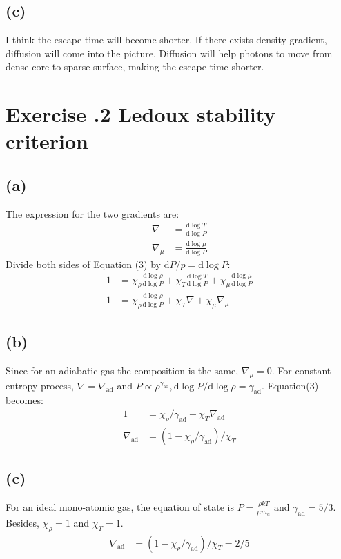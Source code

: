 \documentclass[a4paper,12pt]{article}
\renewcommand{\d}{\mathrm{d}}
\begin{document}
\subsection*{(c)}
I think the escape time will become shorter. If there exists density gradient, diffusion will come into the picture.
Diffusion will help photons to move from dense core to sparse surface, making the escape time shorter.



\section*{\textbf{Exercise \uppercase\expandafter{}.2 Ledoux stability criterion}}
\subsection*{(a)}
The expression for the two gradients are:
\begin{align*}
    \nabla &= \frac{\d \log T}{\d \log P} \\
    \nabla_\mu &= \frac{\d \log \mu }{\d \log P}
\end{align*}
Divide both sides of Equation (3) by $\d P/ p = \d \log P$:
\begin{align*}
    1 &= \chi_\rho \frac{\d \log \rho}{\d \log P} + \chi_T \frac{\d \log T}{\d \log P} + \chi_\mu \frac{\d \log \mu}{\d \log P} \\
    1 &= \chi_\rho \frac{\d \log \rho}{\d \log P} + \chi_T \nabla + \chi_\mu \nabla_\mu
\end{align*}

\subsection*{(b)}
Since for an adiabatic gas the composition is the same, $\nabla_\mu = 0$. 
For constant entropy process, $\nabla = \nabla_\text{ad}$ and $P\propto \rho^{\gamma_{\text{ad}}}, \d \log P/\d \log \rho = \gamma_\text{ad}$.
Equation(3) becomes:
\begin{align*}
    1 &= \chi_\rho / \gamma_\text{ad} + \chi_T \nabla_\text{ad} \\
    \nabla_\text{ad} &= (1-\chi_\rho / \gamma_\text{ad})/\chi_T
\end{align*}

\subsection*{(c)}
For an ideal mono-atomic gas, the equation of state is $P = \frac{\rho kT}{\mu m_u}$ and $\gamma_\text{ad} = 5/3$. Besides, 
$\chi_\rho = 1$ and $\chi_T = 1$.
\begin{align*}
    \nabla_\text{ad} &= (1-\chi_\rho / \gamma_\text{ad})/\chi_T = 2/5
\end{align*}
\end{document}
